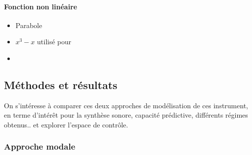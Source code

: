 \paragraph{Fonction non linéaire}

\begin{itemize}
    \item Parabole \cite{mcintyre_oscillations_1983}
    \item $x^3 - x$ \cite{maganza_bifurcations_1986} utilisé pour 
    \item 
\end{itemize}


\subsection{Méthodes et résultats}

On s'intéresse à comparer ces deux approches de modélisation de ces instrument, en terme d'intérêt pour la synthèse sonore, capacité prédictive, différents régimes obtenus.. et explorer l'espace de contrôle. 

\subsubsection{Approche modale}


